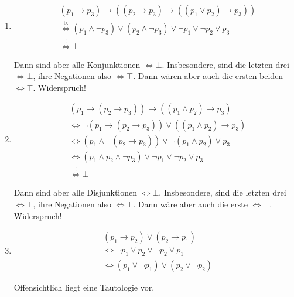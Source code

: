 \begin{solution}
\begin{enumerate}[label = \alph*.]
  \item

  \begin{align*}
    & (p_1 \to p_3) \to ((p_2 \to p_3) \to ((p_1 \lor p_2) \to p_3)) \\
    & \stackrel{\text{b.}}{\iff}
    (p_1 \land \neg p_3) \lor (p_2 \land \neg p_3) \lor \neg p_1 \lor \neg p_2 \lor p_3 \\
    & \stackrel{!}{\iff} \bot
  \end{align*}

  Dann sind aber alle Konjunktionen $\iff \bot$.
  Insbesondere, sind die letzten drei $\iff \bot$, ihre Negationen also $\iff \top$.
  Dann wären aber auch die ersten beiden $\iff \top$.
  Widerspruch!

  \item

  \begin{align*}
    & (p_1 \to (p_2 \to p_3)) \to ((p_1 \land p_2) \to p_3) \\
    & \iff
    \neg (p_1 \to (p_2 \to p_3)) \lor ((p_1 \land p_2) \to p_3) \\
    & \iff
    (p_1 \land \neg (p_2 \to p_3)) \lor \neg (p_1 \land p_2) \lor p_3 \\
    & \iff
    (p_1 \land p_2 \land \neg p_3) \lor \neg p_1 \lor \neg p_2 \lor p_3 \\
    & \stackrel{!}{\iff} \bot
  \end{align*}

  Dann sind aber alle Disjunktionen $\iff \bot$.
  Insbesondere, sind die letzten drei $\iff \bot$, ihre Negationen also $\iff \top$.
  Dann wäre aber auch die erste $\iff \top$.
  Widerspruch!

  \item

  \begin{align*}
    & (p_1 \to p_2) \lor (p_2 \to p_1) \\
    & \iff
    \neg p_1 \lor p_2 \lor \neg p_2 \lor p_1 \\
    & \iff
    (p_1 \lor \neg p_1) \lor (p_2 \lor \neg p_2)
  \end{align*}

  Offensichtlich liegt eine Tautologie vor.

\end{enumerate}

\end{solution}



